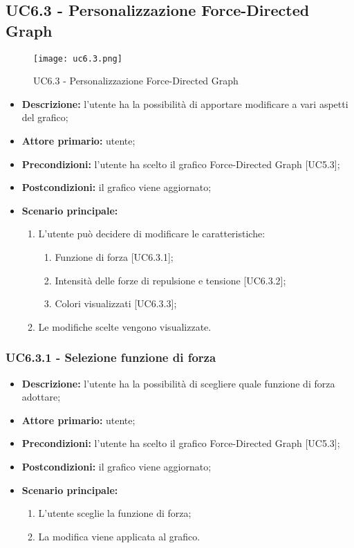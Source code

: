 \subsection{UC6.3 - Personalizzazione Force-Directed Graph}
\begin{figure}[H]
  \centering
  \texttt{[image: uc6.3.png]}
  \caption{UC6.3 - Personalizzazione Force-Directed Graph}
\end{figure}
\begin{itemize}
    \item \textbf{Descrizione:} l'utente ha la possibilità di apportare modificare a vari aspetti del grafico;
    \item \textbf{Attore primario:} utente;
    \item \textbf{Precondizioni:} l’utente ha scelto il grafico Force-Directed Graph [UC5.3];
    \item \textbf{Postcondizioni:} il grafico viene aggiornato;
    \item \textbf{Scenario principale:} 
    \begin{enumerate}
      \item L'utente può decidere di modificare le caratteristiche:
    \begin{enumerate}
      \item Funzione di forza [UC6.3.1];
      \item Intensità delle forze di repulsione e tensione [UC6.3.2];
      \item Colori visualizzati [UC6.3.3];
    \end{enumerate}
    \item Le modifiche scelte vengono visualizzate.
  \end{enumerate}
  \end{itemize}

  \subsubsection{UC6.3.1 - Selezione funzione di forza}
  \begin{itemize}
    \item \textbf{Descrizione:} l'utente ha la possibilità di scegliere quale funzione di forza adottare;
    \item \textbf{Attore primario:} utente;
    \item \textbf{Precondizioni:} l’utente ha scelto il grafico Force-Directed Graph [UC5.3];
    \item \textbf{Postcondizioni:} il grafico viene aggiornato;
    \item \textbf{Scenario principale:} 
     \begin{enumerate}
      \item L'utente sceglie la funzione di forza;
      \item La modifica viene applicata al grafico.
    \end{enumerate}
  \end{itemize}

